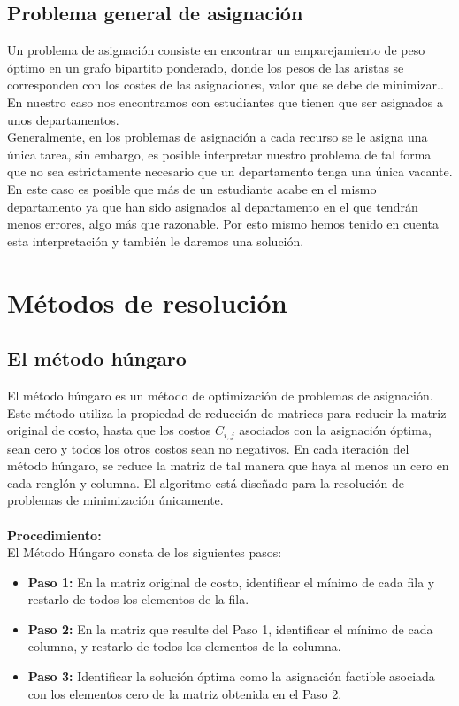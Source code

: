 \documentclass[11pt]{article}
\begin{document}
\subsection{Problema general de asignación}
Un problema de asignación consiste en encontrar un emparejamiento de peso óptimo en un grafo bipartito ponderado, donde los pesos de las aristas se corresponden con los costes de las asignaciones, valor que se debe de minimizar.\cite{wikipediaAsignacion}. En nuestro caso nos encontramos con estudiantes que tienen que ser asignados a unos departamentos.\\

Generalmente, en los problemas de asignación a cada recurso se le asigna una única tarea, sin embargo, es posible interpretar nuestro problema de tal forma que no sea estrictamente necesario que un departamento tenga una única vacante. En este caso es posible que más de un estudiante acabe en el mismo departamento ya que han sido asignados al departamento en el que tendrán menos errores, algo más que razonable. Por esto mismo hemos tenido en cuenta esta interpretación y también le daremos una solución.


\section{Métodos de resolución}
\subsection{El método húngaro}\label{ref:metodohungaro}
El método húngaro\cite{metodohungaroblogspot} es un método de optimización de problemas de asignación. 
Este método utiliza la propiedad de reducción de matrices para reducir la matriz original de costo, hasta que los costos $C_{i,j}$ asociados con la asignación óptima, sean cero y todos los otros costos sean no negativos. En cada iteración del método húngaro, se reduce la matriz de tal manera que haya al menos un cero en cada renglón y columna. El algoritmo está diseñado para la resolución de problemas de minimización únicamente.\\\\
\textbf{Procedimiento:}\\
El Método Húngaro consta de los siguientes pasos:\\

\begin{itemize}
    \item \textbf{Paso 1:} En la matriz original de costo, identificar el mínimo de cada fila y restarlo de todos los elementos de la fila.
    \item \textbf{Paso 2:} En la matriz que resulte del Paso 1, identificar el mínimo de cada columna, y restarlo de todos los elementos de la columna.
    \item \textbf{Paso 3:} Identificar la solución óptima como la asignación factible asociada con los elementos cero de la matriz obtenida en el Paso 2.
\end{itemize}
\end{document}

